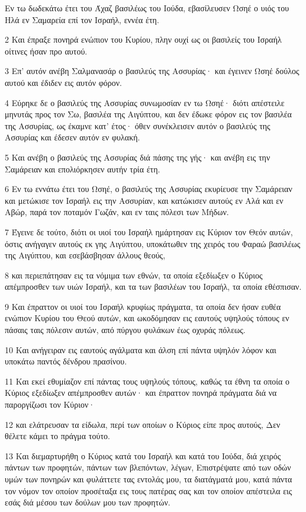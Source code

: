\par Εν τω δωδεκάτω έτει του Άχαζ βασιλέως του Ιούδα, εβασίλευσεν Ωσηέ ο υιός του Ηλά εν Σαμαρεία επί τον Ισραήλ, εννέα έτη.
\par 2 Και έπραξε πονηρά ενώπιον του Κυρίου, πλην ουχί ως οι βασιλείς του Ισραήλ οίτινες ήσαν προ αυτού.
\par 3 Επ' αυτόν ανέβη Σαλμανασάρ ο βασιλεύς της Ασσυρίας· και έγεινεν Ωσηέ δούλος αυτού και έδιδεν εις αυτόν φόρον.
\par 4 Εύρηκε δε ο βασιλεύς της Ασσυρίας συνωμοσίαν εν τω Ωσηέ· διότι απέστειλε μηνυτάς προς τον Σω, βασιλέα της Αιγύπτου, και δεν έδωκε φόρον εις τον βασιλέα της Ασσυρίας, ως έκαμνε κατ' έτος· όθεν συνέκλεισεν αυτόν ο βασιλεύς της Ασσυρίας και έδεσεν αυτόν εν φυλακή.
\par 5 Και ανέβη ο βασιλεύς της Ασσυρίας διά πάσης της γής· και ανέβη εις την Σαμάρειαν και επολιόρκησεν αυτήν τρία έτη.
\par 6 Εν τω εννάτω έτει του Ωσηέ, ο βασιλεύς της Ασσυρίας εκυρίευσε την Σαμάρειαν και μετώκισε τον Ισραήλ εις την Ασσυρίαν, και κατώκισεν αυτούς εν Αλά και εν Αβώρ, παρά τον ποταμόν Γωζάν, και εν ταις πόλεσι των Μήδων.
\par 7 Έγεινε δε τούτο, διότι οι υιοί του Ισραήλ ημάρτησαν εις Κύριον τον Θεόν αυτών, όστις ανήγαγεν αυτούς εκ γης Αιγύπτου, υποκάτωθεν της χειρός του Φαραώ βασιλέως της Αιγύπτου, και εσεβάσβησαν άλλους θεούς,
\par 8 και περιεπάτησαν εις τα νόμιμα των εθνών, τα οποία εξεδίωξεν ο Κύριος απέμπροσθεν των υιών Ισραήλ, και τα των βασιλέων του Ισραήλ, τα οποία εθέσπισαν.
\par 9 Και έπραττον οι υιοί του Ισραήλ κρυφίως πράγματα, τα οποία δεν ήσαν ευθέα ενώπιον Κυρίου του Θεού αυτών, και ωκοδόμησαν εις εαυτούς υψηλούς τόπους εν πάσαις ταις πόλεσιν αυτών, από πύργου φυλάκων έως οχυράς πόλεως.
\par 10 Και ανήγειραν εις εαυτούς αγάλματα και άλση επί πάντα υψηλόν λόφον και υποκάτω παντός δένδρου πρασίνου.
\par 11 Και εκεί εθυμίαζον επί πάντας τους υψηλούς τόπους, καθώς τα έθνη τα οποία ο Κύριος εξεδίωξεν απέμπροσθεν αυτών· και έπραττον πονηρά πράγματα διά να παροργίζωσι τον Κύριον·
\par 12 και ελάτρευσαν τα είδωλα, περί των οποίων ο Κύριος είπε προς αυτούς, Δεν θέλετε κάμει το πράγμα τούτο.
\par 13 Και διεμαρτυρήθη ο Κύριος κατά του Ισραήλ και κατά του Ιούδα, διά χειρός πάντων των προφητών, πάντων των βλεπόντων, λέγων, Επιστρέψατε από των οδών υμών των πονηρών και φυλάττετε τας εντολάς μου, τα διατάγματά μου, κατά πάντα τον νόμον τον οποίον προσέταξα εις τους πατέρας σας και τον οποίον απέστειλα εις εσάς διά μέσου των δούλων μου των προφητών.
